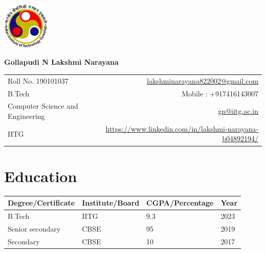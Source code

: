 \documentclass[a4paper,10pt]{report}
\begin{document}
\vspace{-0.1000pt}


\parbox{2.3cm}{

\includegraphics[width=2.25cm,clip]{iitg_logo.jpg}

}
\parbox{\dimexpr\linewidth-2.3cm\relax}{

\textbf{\huge Gollapudi N Lakshmi Narayana}\\
\begin{tabular*}{\textwidth}{l@{\hskip 1.25cm}r}


{Roll No. 190101037}&\href{mailto:lakshminarayana822002@gmail.com}{ lakshminarayana822002@gmail.com}\\
{B.Tech}& Mobile : +917416143007\\
{Computer Science and Engineering}&\href{mailto:gn@iitg.ac.in}{ gn@iitg.ac.in}\\
{IITG} & \href{https://www.linkedin.com/in/lakshmi-narayana-b04892194//}{https://www.linkedin.com/in/lakshmi-narayana-b04892194/}

\end{tabular*}
}


\vspace{5pt}


\section{Education}
\centering
 \begin{tabu} to 1\textwidth { | X[c] | X[c] | X[c] | X[c]| }
 \hline   \textbf{Degree/Certificate} & \textbf{Institute/Board} & \textbf{CGPA/Percentage} & \textbf{Year} \\
 
\hline B.Tech& IITG& 9.3& 2023\\
\hline Senior secondary& CBSE& 95& 2019\\
\hline Secondary& CBSE& 10& 2017\\

\hline
\end{tabu}
\end{document}
